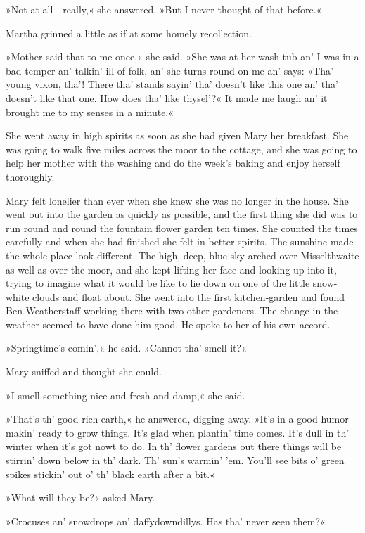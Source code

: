 »Not at all—really,« she answered. »But I never thought of that before.«

Martha grinned a little as if at some homely recollection.

»Mother said that to me once,« she said. »She was at her wash-tub an' I was in a bad temper an' talkin' ill of folk, an' she turns round on me an' says: »Tha' young vixon, tha'! There tha' stands sayin' tha' doesn't like this one an' tha' doesn't like that one. How does tha' like thysel'?« It made me laugh an' it brought me to my senses in a minute.«

She went away in high spirits as soon as she had given Mary her breakfast. She was going to walk five miles across the moor to the cottage, and she was going to help her mother with the washing and do the week's baking and enjoy herself thoroughly.

Mary felt lonelier than ever when she knew she was no longer in the house. She went out into the garden as quickly as possible, and the first thing she did was to run round and round the fountain flower garden ten times. She counted the times carefully and when she had finished she felt in better spirits. The sunshine made the whole place look different. The high, deep, blue sky arched over Misselthwaite as well as over the moor, and she kept lifting her face and looking up into it, trying to imagine what it would be like to lie down on one of the little snow-white clouds and float about. She went into the first kitchen-garden and found Ben Weatherstaff working there with two other gardeners. The change in the weather seemed to have done him good. He spoke to her of his own accord.

»Springtime's comin',« he said. »Cannot tha' smell it?«

Mary sniffed and thought she could.

»I smell something nice and fresh and damp,« she said.

»That's th' good rich earth,« he answered, digging away. »It's in a good humor makin' ready to grow things. It's glad when plantin' time comes. It's dull in th' winter when it's got nowt to do. In th' flower gardens out there things will be stirrin' down below in th' dark. Th' sun's warmin' 'em. You'll see bits o' green spikes stickin' out o' th' black earth after a bit.«

»What will they be?« asked Mary.

»Crocuses an' snowdrops an' daffydowndillys. Has tha' never seen them?«

